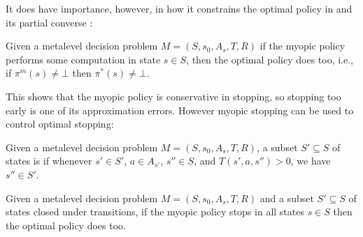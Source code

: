 It does have importance, however, in how it constrains the optimal policy in 
and its partial converse :

	
\begin{thm}\label{thm:optimal-myopic}
	Given a metalevel decision problem $M=(S,s_0,A_s,T,R)$
	if the myopic policy performs some computation in state $s\in S$,
	then the optimal policy does too, i.e., if $\pi^m(s)\neq\bot$ then $\pi^*(s)\neq\bot$.
\end{thm}

\begin{comment}
	\begin{proof}
		Observe that the myopic Q-function \eqref{dfn:myopic} is equivalently given by
		\[
			Q^m(s,a) = Q^\bot(s,a)
		\]
		where $\bot$ is the policy which immediately stops $\bot(s)=\bot$.
		Thus $Q^m(s,a) \le Q^*(s,a)$.  If the optimal policy stops in a state $s\in S$ then
		\[
			Q^{\pi^*}(s,a) \le \max_i \mu_i(s),
		\]
		and so the same holds for $Q^m$, showing the myopic stops.
	\end{proof}
\end{comment}


This shows that the myopic policy is conservative in stopping, so stopping too early
is one of its approximation errors.  However myopic stopping can be used to control optimal stopping:

\begin{dfn}\label{dfn:closed}
	Given a metalevel decision problem $M=(S,s_0,A_s,T,R)$,
	a subset $S'\subseteq S$ of states is 
	if whenever $s'\in S'$, $a\in A_{s'}$, $s''\in S$, and $T(s',a,s'')>0$,
	we have $s''\in S'$.
\end{dfn}

\begin{thm}\label{thm:myopic-optimal}
	Given a metalevel decision problem $M=(S,s_0,A_s,T,R)$
	and a subset $S'\subseteq S$ of states closed under transitions,	
	if the myopic policy stops in all states $s\in S$
	then the optimal policy does too.	
\end{thm}

